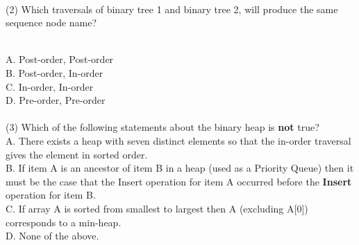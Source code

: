 \documentclass[10.5pt]{article}
\begin{document}
~\\
(2) Which traversals of binary tree 1 and binary tree 2, will produce the same sequence node name?\\
\begin{minipage}{1\textwidth}
\centering
{}
\end{minipage} \\
A. Post-order, Post-order \\
B. Post-order, In-order \\
C. In-order, In-order \\
D. Pre-order, Pre-order \\
~\\

(3) Which of the following statements about the binary heap is \textbf{not} true? \\
A. There exists a heap with seven distinct elements so that the in-order traversal gives the element in sorted order. \\
B. If item A is an ancestor of item B in a heap (used as a Priority Queue) then it must be the case that the Insert operation for item A occurred before the \textbf{Insert} operation for item B.\\
C. If array A is sorted from smallest to largest then A (excluding A[0]) corresponds to a min-heap. \\
D. None of the above. \\
~\\
\end{document}
